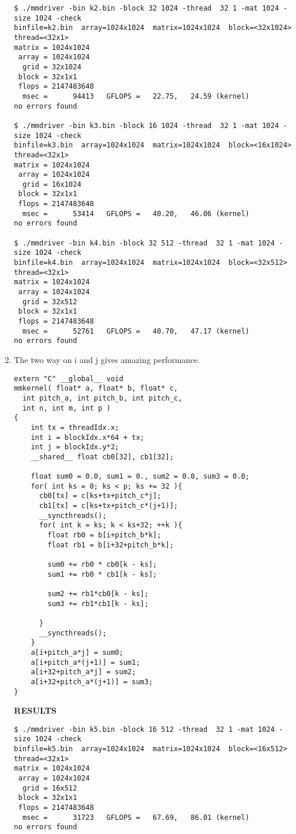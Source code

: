 \documentclass[11pt]{article}
\begin{document}
\begin{enumerate}
\begin{lstlisting}
$ ./mmdriver -bin k2.bin -block 32 1024 -thread  32 1 -mat 1024 -size 1024 -check
binfile=k2.bin  array=1024x1024  matrix=1024x1024  block=<32x1024>  thread=<32x1>
matrix = 1024x1024
 array = 1024x1024
  grid = 32x1024
 block = 32x1x1
 flops = 2147483648
  msec =      94413   GFLOPS =   22.75,   24.59 (kernel)
no errors found

$ ./mmdriver -bin k3.bin -block 16 1024 -thread  32 1 -mat 1024 -size 1024 -check
binfile=k3.bin  array=1024x1024  matrix=1024x1024  block=<16x1024>  thread=<32x1>
matrix = 1024x1024
 array = 1024x1024
  grid = 16x1024
 block = 32x1x1
 flops = 2147483648
  msec =      53414   GFLOPS =   40.20,   46.06 (kernel)
no errors found

$ ./mmdriver -bin k4.bin -block 32 512 -thread  32 1 -mat 1024 -size 1024 -check
binfile=k4.bin  array=1024x1024  matrix=1024x1024  block=<32x512>  thread=<32x1>
matrix = 1024x1024
 array = 1024x1024
  grid = 32x512
 block = 32x1x1
 flops = 2147483648
  msec =      52761   GFLOPS =   40.70,   47.17 (kernel)
no errors found
\end{lstlisting}
\item The two way on i and j gives amazing performance.

\begin{lstlisting}
extern "C" __global__ void
mmkernel( float* a, float* b, float* c,
  int pitch_a, int pitch_b, int pitch_c,
  int n, int m, int p )
{
    int tx = threadIdx.x;
    int i = blockIdx.x*64 + tx;
    int j = blockIdx.y*2;
    __shared__ float cb0[32], cb1[32];

    float sum0 = 0.0, sum1 = 0., sum2 = 0.0, sum3 = 0.0;
    for( int ks = 0; ks < p; ks += 32 ){
      cb0[tx] = c[ks+tx+pitch_c*j];
      cb1[tx] = c[ks+tx+pitch_c*(j+1)];
      __syncthreads();
      for( int k = ks; k < ks+32; ++k ){
        float rb0 = b[i+pitch_b*k];
        float rb1 = b[i+32+pitch_b*k];

        sum0 += rb0 * cb0[k - ks];
        sum1 += rb0 * cb1[k - ks];

        sum2 += rb1*cb0[k - ks];
        sum3 += rb1*cb1[k - ks];

      }
      __syncthreads();
    }
    a[i+pitch_a*j] = sum0;
    a[i+pitch_a*(j+1)] = sum1;
    a[i+32+pitch_a*j] = sum2;
    a[i+32+pitch_a*(j+1)] = sum3;
}
\end{lstlisting}

\textbf{RESULTS}
\begin{lstlisting}
$ ./mmdriver -bin k5.bin -block 16 512 -thread  32 1 -mat 1024 -size 1024 -check
binfile=k5.bin  array=1024x1024  matrix=1024x1024  block=<16x512>  thread=<32x1>
matrix = 1024x1024
 array = 1024x1024
  grid = 16x512
 block = 32x1x1
 flops = 2147483648
  msec =      31723   GFLOPS =   67.69,   86.01 (kernel)
no errors found
\end{lstlisting}


\end{enumerate}
\end{document}
